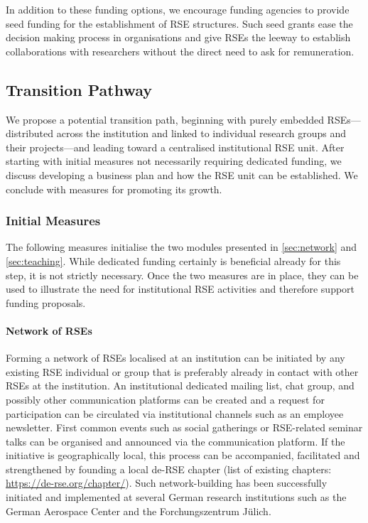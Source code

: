 \documentclass[10pt,letterpaper]{article}
\begin{document}
In addition to these funding options, we encourage funding agencies to provide seed funding for the establishment of RSE structures.
Such seed grants ease the decision making process in organisations and give RSEs the leeway to establish collaborations with researchers without the direct need to ask for remuneration.

\subsection*{Transition Pathway}

We propose a potential transition path, beginning with purely embedded RSEs---distributed across the institution and linked to individual research groups and their projects---and leading toward a centralised institutional RSE unit.
After starting with initial measures not necessarily requiring dedicated funding, we discuss developing a business plan and how the RSE unit can be established.
We conclude with measures for promoting its growth.

\subsubsection*{Initial Measures}
The following measures initialise the two modules presented in \autoref{sec:network} and \autoref{sec:teaching}.
While dedicated funding certainly is beneficial already for this step, it is not strictly necessary.
Once the two measures are in place, they can be used to illustrate the need for institutional RSE activities and therefore support funding proposals.

\paragraph{Network of RSEs}
Forming a network of RSEs localised at an institution can be initiated by any existing RSE individual or group that is preferably already in contact with other RSEs at the institution.
An institutional dedicated mailing list, chat group, and possibly other communication platforms can be created and a request for participation can be circulated via institutional channels such as an employee newsletter.
First common events such as social gatherings or RSE-related seminar talks can be organised and announced via the communication platform.
If the initiative is geographically local, this process can be accompanied, facilitated and strengthened by founding a local de-RSE chapter (list of existing chapters: \url{https://de-rse.org/chapter/}).
Such network-building has been successfully initiated and implemented at several German research institutions such as the German Aerospace Center and the Forchungszentrum Jülich.
\end{document}
